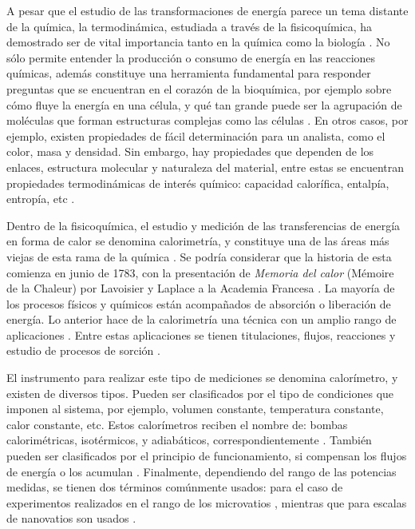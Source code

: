 	A pesar que el estudio de las transformaciones de energía parece un tema distante de la química, la termodinámica, estudiada a través de la fisicoquímica, ha demostrado ser de vital importancia tanto en la química como la biología \cite{atkins2011physical}. No sólo permite entender la producción o consumo de energía en las reacciones químicas, además constituye una herramienta fundamental para responder preguntas que se encuentran en el corazón de la bioquímica, por ejemplo sobre cómo fluye la energía en una célula, y qué tan grande puede ser la agrupación de moléculas que forman estructuras complejas como las células \cite{atkins2011physical}. En otros casos, por ejemplo, existen propiedades de fácil determinación para un analista, como el color, masa y densidad. Sin embargo, hay propiedades que dependen de los enlaces, estructura molecular y naturaleza del material, entre estas se encuentran propiedades termodinámicas de interés químico: capacidad calorífica, entalpía, entropía, etc \cite{gaisford2016principles}.
	
	\newpage
	
	Dentro de la fisicoquímica, el estudio y medición de las transferencias de energía en forma de calor se denomina calorimetría, y constituye una de las áreas más viejas de esta rama de la química \cite{zielenkiewicz2006theory}. Se podría considerar que la historia de esta comienza en junio de 1783, con la presentación de \textit{Memoria del calor} (Mémoire de la Chaleur) por Lavoisier y Laplace a la Academia Francesa \cite{zielenkiewicz2006theory}. La mayoría de los procesos físicos y químicos están acompañados de absorción o liberación de energía. Lo anterior hace de la calorimetría una técnica con un amplio rango de aplicaciones \cite{wadso2001standards}. Entre estas aplicaciones se tienen titulaciones, flujos, reacciones y estudio de procesos de sorción \cite{gaisford2016principles}.
	
	El instrumento para realizar este tipo de mediciones se denomina calorímetro, y existen de diversos tipos. Pueden ser clasificados por el tipo de condiciones que imponen al sistema, por ejemplo, volumen constante, temperatura constante, calor constante, etc. Estos calorímetros reciben el nombre de: bombas calorimétricas, isotérmicos, y adiabáticos, correspondientemente \cite{gaisford2016principles, wadso2001standards}. También pueden ser clasificados por el principio de funcionamiento, si compensan los flujos de energía o los acumulan \cite{gaisford2016principles}. Finalmente, dependiendo del rango de las potencias medidas, se tienen dos términos comúnmente usados:  para el caso de experimentos realizados en el rango de los microvatios \cite{wadso2001standards, wadso2003new}, mientras que para escalas de nanovatios son usados  \cite{wadso2003new}.
	
